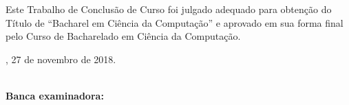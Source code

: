 \documentclass[a5paper]{ufsc-thesis}
\begin{document}
%
% 
%
\begin{folhadeaprovacao}

	\begin{center}
		{\ABNTEXchapterfont\large\imprimirautor}
		
		\vspace*{\fill}
		\begin{center}
			\ABNTEXchapterfont\bfseries\Large\imprimirtitulo
		\end{center}
		\vspace*{\fill}

		\hspace{.45\textwidth}
		\vspace*{\fill}
	\end{center}

	Este Trabalho de Conclusão de Curso foi julgado adequado para obtenção do 
	Título de ``Bacharel em Ciência da Computação'' e aprovado em sua forma final
	pelo Curso de Bacharelado em Ciência da Computação.
   
	\begin{center}   
	\imprimirlocal, 27 de novembro de 2018.
	\end{center}


	\noindent\textbf{\\Banca examinadora:}

  
\end{folhadeaprovacao}

\begin{dedicatoria}
   \vspace*{\fill}
   \centering
   \noindent
    \vspace*{\fill}
\end{dedicatoria}
\end{document}

